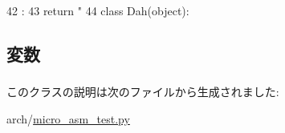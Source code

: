 \begin{DoxyCode}
42                      :
43         return "%
44 
class Dah(object):
\end{DoxyCode}


\subsection{変数}
\hypertarget{classmicro__asm__test_1_1Hoop_aaf1ad8da0f374cbd19a0a177d5280477}{
\subsubsection[{mnemonic}]{}}
\label{classmicro__asm__test_1_1Hoop_aaf1ad8da0f374cbd19a0a177d5280477}


このクラスの説明は次のファイルから生成されました:\begin{DoxyCompactItemize}
\item 
arch/\hyperlink{micro__asm__test_8py}{micro\_\-asm\_\-test.py}\end{DoxyCompactItemize}

